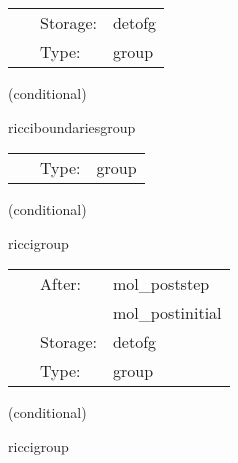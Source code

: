 \hspace{5mm}

 \begin{tabular*}{160mm}{cll} 
~ & Storage:  & detofg \\ 
~ & Type:  & group \\ 
\end{tabular*} 


\vspace{5mm}

   (conditional) 

\hspace{5mm} ricciboundariesgroup 

\hspace{5mm}{\it set ricci tensor on the boundary } 


\hspace{5mm}

 \begin{tabular*}{160mm}{cll} 
~ & Type:  & group \\ 
\end{tabular*} 


\vspace{5mm}

   (conditional) 

\hspace{5mm} riccigroup 

\hspace{5mm}{\it calculate ricci tensor, with boundary conditions } 


\hspace{5mm}

 \begin{tabular*}{160mm}{cll} 
~ & After:  & mol\_poststep \\ 
~& ~ &mol\_postinitial\\ 
~ & Storage:  & detofg \\ 
~ & Type:  & group \\ 
\end{tabular*} 


\vspace{5mm}

   (conditional) 

\hspace{5mm} riccigroup 

\hspace{5mm}{\it calculate ricci tensor, with boundary conditions } 


\hspace{5mm}

